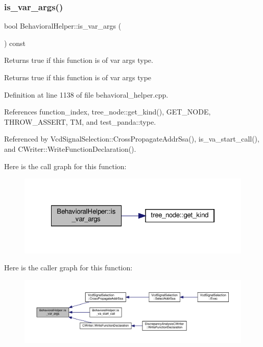 \subsubsection{\texorpdfstring{is\+\_\+var\+\_\+args()}{is\_var\_args()}}
{\footnotesize\ttfamily bool Behavioral\+Helper\+::is\+\_\+var\+\_\+args (\begin{DoxyParamCaption}{ }\end{DoxyParamCaption}) const\hspace{0.3cm}{\ttfamily [virtual]}}



Returns true if this function is of var args type. 

\begin{DoxyReturn}{Returns}
true if this function is of var args type 
\end{DoxyReturn}


Definition at line 1138 of file behavioral\+\_\+helper.\+cpp.



References function\+\_\+index, tree\+\_\+node\+::get\+\_\+kind(), G\+E\+T\+\_\+\+N\+O\+DE, T\+H\+R\+O\+W\+\_\+\+A\+S\+S\+E\+RT, TM, and test\+\_\+panda\+::type.



Referenced by Vcd\+Signal\+Selection\+::\+Cross\+Propagate\+Addr\+Ssa(), is\+\_\+va\+\_\+start\+\_\+call(), and C\+Writer\+::\+Write\+Function\+Declaration().

Here is the call graph for this function\+:
\nopagebreak
\begin{figure}[H]
\begin{center}
\leavevmode
\includegraphics[width=322pt]{dd/db2/classBehavioralHelper_adc713dd555c80762dbbc0f4fbe052ce9_cgraph}
\end{center}
\end{figure}
Here is the caller graph for this function\+:
\nopagebreak
\begin{figure}[H]
\begin{center}
\leavevmode
\includegraphics[width=350pt]{dd/db2/classBehavioralHelper_adc713dd555c80762dbbc0f4fbe052ce9_icgraph}
\end{center}
\end{figure}
\mbox{\label{classBehavioralHelper_a486a12168fcbe079b7963cb5053e089e}} 
